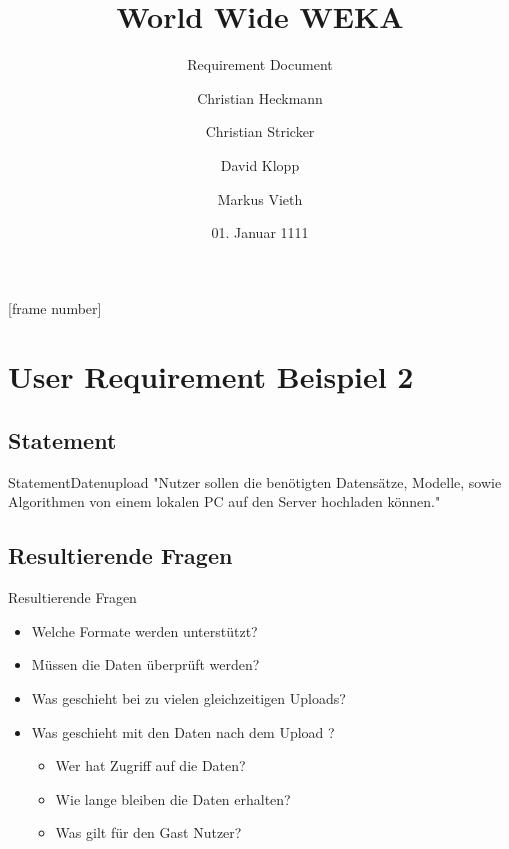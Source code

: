 \documentclass{beamer}
\title[WWWEKA]{World Wide WEKA}
\subtitle{Requirement Document}
\author[C. Heckmann\and C. Stricker\and D. Klopp\and M. Vieth]{Christian Heckmann\and Christian Stricker\and David Klopp\and Markus Vieth}
\date[01.01.1111]{01. Januar 1111}
\begin{document}
	
	\frame{
		\titlepage
	}
	[frame number]
	
	
	
	\section[User Requirement 2]{User Requirement Beispiel 2}
	\subsection[Statement]{Statement}
	\begin{frame}{Statement}{Datenupload}
			"Nutzer sollen die benötigten Datensätze, Modelle, sowie Algorithmen von einem lokalen PC auf den Server hochladen können."
	\end{frame}
	
	\subsection[Resultierende Fragen]{Resultierende Fragen}
	\begin{frame}[<+->][t]{Resultierende Fragen}
		\begin{itemize}		
			\item Welche Formate werden unterstützt?
			\item Müssen die Daten überprüft werden?
			\item Was geschieht bei zu vielen gleichzeitigen Uploads?
			\item Was geschieht mit den Daten nach dem Upload ?
			\begin{itemize}	
				\item Wer hat Zugriff auf die Daten?
				\item Wie lange bleiben die Daten erhalten?
				\item Was gilt für den Gast Nutzer?
			\end{itemize}
		\end{itemize}
	\end{frame}
	
\end{document}
